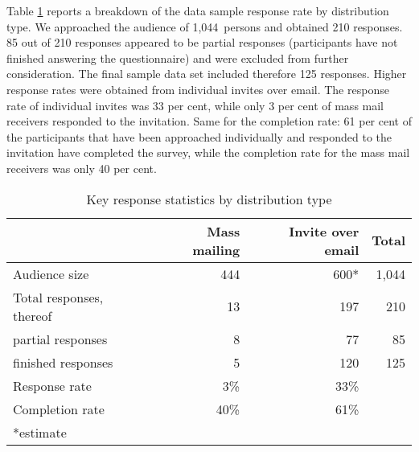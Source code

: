 \documentclass{article}
\begin{document}
Table \ref{tab:response-rates} reports a breakdown of the data sample response rate by distribution type. We approached the audience of 1,044~persons and obtained 210 responses. 85 out of 210 responses appeared to be partial responses (participants have not finished answering the questionnaire) and were excluded from further consideration. The final sample data set included therefore 125 responses.
Higher response rates were obtained from individual invites over email.
The response rate of individual invites was 33 per cent, while only 3 per cent of mass mail receivers responded to the invitation.
Same for the completion rate: 61 per cent of the participants that have been approached individually and responded to the invitation have completed the survey, while the completion rate for the mass mail receivers was only 40 per cent.
  \begin{table}[hbt]
  \small
 \caption{Key response statistics by distribution type}
  \centering
  \begin{tabular}{lrrr}
    & Mass mailing & Invite over email & Total \\
    \midrule
   Audience size & 444 & 600* & 1,044 \\
   Total responses, thereof & 13 & 197 & 210 \\
   { } partial responses & 8 & 77 & 85 \\
   { } finished responses & 5 & 120 & 125 \\
   \midrule
   Response rate & 3\% & 33\% \\
   Completion rate & 40\% & 61\% \\
    \bottomrule
    *estimate
  \end{tabular}
  \label{tab:response-rates}
 \end{table}



\end{document}
